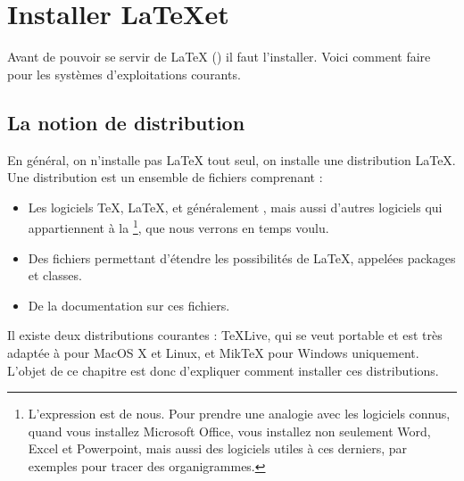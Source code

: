 \chapter{Installer \LaTeX et \XeLaTeX}\label{install}

\begin{prealable}
	Avant de pouvoir se servir de \LaTeX{} (\XeLaTeX) il faut l'installer. Voici comment faire pour les systèmes d'exploitations courants.
\end{prealable}

\section{La notion de distribution}

En général, on n'installe pas \LaTeX{} tout seul, on installe une distribution \LaTeX{}. Une distribution est un ensemble de fichiers comprenant :
\begin{itemize}
\item Les logiciels \TeX, \LaTeX, et généralement \XeLaTeX, mais aussi d'autres logiciels qui appartiennent à la  \footnote{L'expression est de nous. Pour prendre une analogie avec les logiciels connus, quand vous installez Microsoft Office, vous installez non seulement Word, Excel et Powerpoint, mais aussi des logiciels utiles à ces derniers, par exemples pour tracer des organigrammes.}, que nous verrons en temps voulu.
\item Des fichiers permettant d'étendre les possibilités de \LaTeX, appelées packages et classes.
\item De la documentation sur ces fichiers.
\end{itemize}

Il existe deux distributions courantes : TeXLive, qui se veut portable et est très adaptée à pour MacOS X et Linux, et MikTeX pour Windows uniquement. L'objet de ce chapitre est donc d'expliquer comment installer ces distributions.




